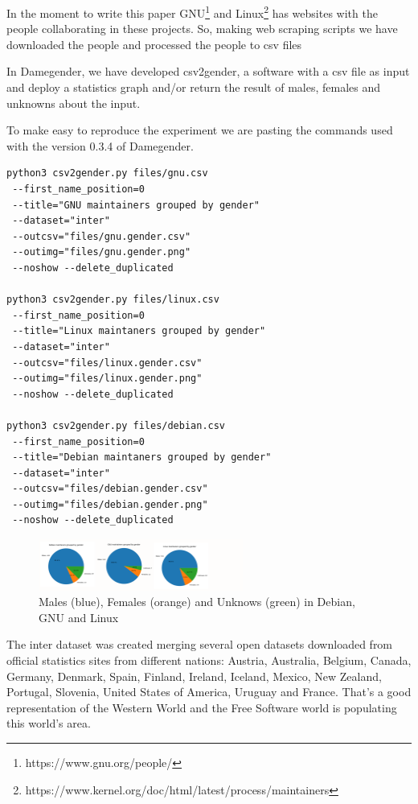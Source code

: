 \documentclass[a4paper]{article}
\begin{document}
In the moment to write this paper
GNU\footnote{https://www.gnu.org/people/} and
Linux\footnote{https://www.kernel.org/doc/html/latest/process/maintainers}
has websites with the people collaborating in these projects. So,
making web scraping scripts we have downloaded the people and processed
the people to csv files

In Damegender, we have developed csv2gender, a software with a csv
file as input and deploy a statistics graph and/or return the result
of males, females and unknowns about the input.

To make easy to reproduce the experiment we are pasting the commands
used with the version 0.3.4 of Damegender.

\begin{verbatim}
python3 csv2gender.py files/gnu.csv
 --first_name_position=0 
 --title="GNU maintainers grouped by gender"
 --dataset="inter" 
 --outcsv="files/gnu.gender.csv"
 --outimg="files/gnu.gender.png" 
 --noshow --delete_duplicated

python3 csv2gender.py files/linux.csv
 --first_name_position=0 
 --title="Linux maintaners grouped by gender"
 --dataset="inter" 
 --outcsv="files/linux.gender.csv"
 --outimg="files/linux.gender.png" 
 --noshow --delete_duplicated

python3 csv2gender.py files/debian.csv
 --first_name_position=0 
 --title="Debian maintaners grouped by gender"
 --dataset="inter" 
 --outcsv="files/debian.gender.csv"
 --outimg="files/debian.gender.png" 
 --noshow --delete_duplicated
\end{verbatim}

\begin{figure}
  \centering
  \includegraphics[width=0.6\textwidth]{images/debian-gnu-linux.pdf}     
  \caption[Caption for LOF]{Males (blue), Females (orange) and Unknows (green) in Debian, GNU and Linux}
\end{figure}

The inter dataset was created merging several open datasets downloaded
from official statistics sites from different nations: Austria,
Australia, Belgium, Canada, Germany, Denmark, Spain, Finland, Ireland,
Iceland, Mexico, New Zealand, Portugal, Slovenia, United States of
America, Uruguay and France. That's a good representation of the
Western World and the Free Software world is populating this world's
area\cite{gonzalez2008geographic}.
\end{document}
